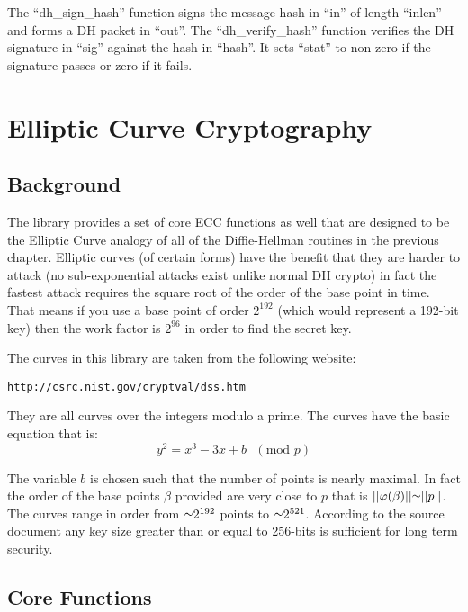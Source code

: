 \documentclass[a4paper]{book}
\def\approx{\raisebox{0.2ex}{\mbox{\small $\sim$}}}
\def\phi{\varphi}
\begin{document}
The ``dh\_sign\_hash'' function signs the message hash in ``in'' of length ``inlen'' and forms a DH packet in ``out''.  
The ``dh\_verify\_hash'' function verifies the DH signature in ``sig'' against the hash in ``hash''.  It sets ``stat''
to non-zero if the signature passes or zero if it fails.

\chapter{Elliptic Curve Cryptography}

\section{Background}
The library provides a set of core ECC functions as well that are designed to be the Elliptic Curve analogy of all of the 
Diffie-Hellman routines in the previous chapter.  Elliptic curves (of certain forms) have the benefit that they are harder
to attack (no sub-exponential attacks exist unlike normal DH crypto) in fact the fastest attack requires the square root
of the order of the base point in time.  That means if you use a base point of order $2^{192}$ (which would represent a
192-bit key) then the work factor is $2^{96}$ in order to find the secret key.

The curves in this library are taken from the following website:
\begin{verbatim}
http://csrc.nist.gov/cryptval/dss.htm
\end{verbatim}

They are all curves over the integers modulo a prime.  The curves have the basic equation that is:
\begin{equation}
y^2 = x^3 - 3x + b\mbox{ }(\mbox{mod }p)
\end{equation}

The variable $b$ is chosen such that the number of points is nearly maximal.  In fact the order of the base points $\beta$ 
provided are very close to $p$ that is $\vert \vert \phi(\beta) \vert \vert \approx \vert \vert p \vert \vert$.  The curves
range in order from $\approx 2^{192}$ points to $\approx 2^{521}$.  According to the source document any key size greater
than or equal to 256-bits is sufficient for long term security.  

\section{Core Functions}
\end{document}
